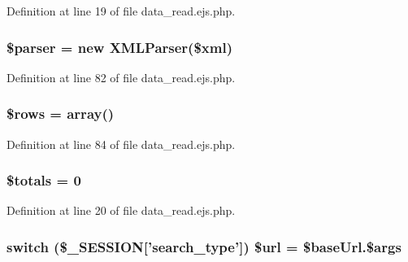 \-Definition at line 19 of file data\-\_\-read.\-ejs.\-php.

\hypertarget{miscellaneous_2websearch_2data__read_8ejs_8php_a147a766daa03d52576c7345fea31c945}{
\subsubsection[{\$parser}]{\setlength{\rightskip}{0pt plus 5cm}\$parser = new {\bf \-X\-M\-L\-Parser}(\$xml)}}\label{miscellaneous_2websearch_2data__read_8ejs_8php_a147a766daa03d52576c7345fea31c945}


\-Definition at line 82 of file data\-\_\-read.\-ejs.\-php.

\hypertarget{miscellaneous_2websearch_2data__read_8ejs_8php_ace2ec39e7df3899fa8df9640ec274b03}{
\subsubsection[{\$rows}]{\setlength{\rightskip}{0pt plus 5cm}\$rows = array()}}\label{miscellaneous_2websearch_2data__read_8ejs_8php_ace2ec39e7df3899fa8df9640ec274b03}


\-Definition at line 84 of file data\-\_\-read.\-ejs.\-php.

\hypertarget{miscellaneous_2websearch_2data__read_8ejs_8php_ab3c7a9eeb638bd5906689f9d5cba65bc}{
\subsubsection[{\$totals}]{\setlength{\rightskip}{0pt plus 5cm}\$totals = 0}}\label{miscellaneous_2websearch_2data__read_8ejs_8php_ab3c7a9eeb638bd5906689f9d5cba65bc}


\-Definition at line 20 of file data\-\_\-read.\-ejs.\-php.

\hypertarget{miscellaneous_2websearch_2data__read_8ejs_8php_a8d5b9b337ab7c5f5a8c5f8d774e0c6b5}{
\subsubsection[{\$url}]{\setlength{\rightskip}{0pt plus 5cm}switch (\$\-\_\-\-S\-E\-S\-S\-I\-O\-N\mbox{[}'search\-\_\-type'\mbox{]}) \$url = \$base\-Url.\$args}}\label{miscellaneous_2websearch_2data__read_8ejs_8php_a8d5b9b337ab7c5f5a8c5f8d774e0c6b5}


